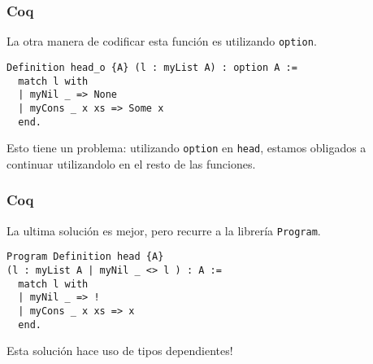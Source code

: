 \documentclass{beamer}
\begin{document}

\begin{frame}[fragile]
\frametitle{Coq}

La otra manera de codificar esta función es utilizando \lstinline{option}.

\begin{lstlisting}
Definition head_o {A} (l : myList A) : option A :=
  match l with
  | myNil _ => None
  | myCons _ x xs => Some x
  end.
\end{lstlisting}

Esto tiene un problema: utilizando \lstinline{option} en \lstinline{head}, estamos obligados a continuar utilizandolo en el resto de las funciones.

\end{frame}

\begin{frame}[fragile]
\frametitle{Coq}

La ultima solución es mejor, pero recurre a la librería \lstinline{Program}.

\begin{lstlisting}
Program Definition head {A}
(l : myList A | myNil _ <> l ) : A :=
  match l with
  | myNil _ => !
  | myCons _ x xs => x
  end.
\end{lstlisting}

Esta solución hace uso de tipos dependientes!
\end{frame}
\end{document}
